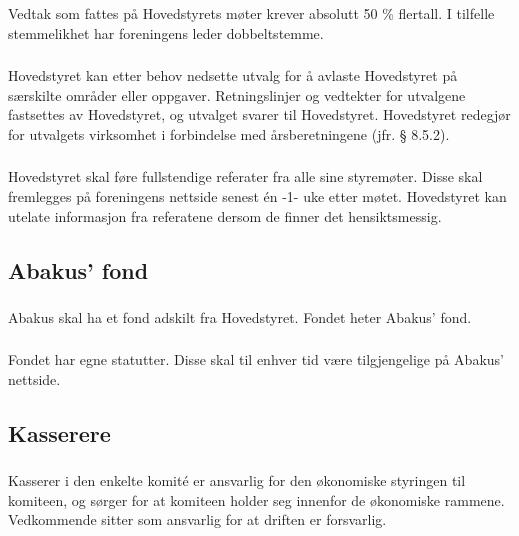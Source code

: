 \subsubsection{}
Vedtak som fattes på Hovedstyrets møter krever absolutt 50 \% flertall. I
tilfelle stemmelikhet har foreningens leder dobbeltstemme.

\subsubsection{}
Hovedstyret kan etter behov nedsette utvalg for å avlaste Hovedstyret på
særskilte områder eller oppgaver. Retningslinjer og vedtekter for utvalgene
fastsettes av Hovedstyret, og utvalget svarer til Hovedstyret. Hovedstyret
redegjør for utvalgets virksomhet i forbindelse med årsberetningene (jfr. §
8.5.2).

\subsubsection{}
Hovedstyret skal føre fullstendige referater fra alle sine styremøter. Disse
skal fremlegges på foreningens nettside senest én -1- uke etter møtet.
Hovedstyret kan utelate informasjon fra referatene dersom de finner det
hensiktsmessig.

\subsection{Abakus’ fond}

\subsubsection{}
Abakus skal ha et fond adskilt fra Hovedstyret. Fondet heter Abakus’ fond.

\subsubsection{}
Fondet har egne statutter. Disse skal til enhver tid være tilgjengelige på
Abakus’ nettside.

\subsection{Kasserere}

\subsubsection{}
Kasserer i den enkelte komité er ansvarlig for den økonomiske styringen til
komiteen, og sørger for at komiteen holder seg innenfor de økonomiske rammene.
Vedkommende sitter som ansvarlig for at driften er forsvarlig.

